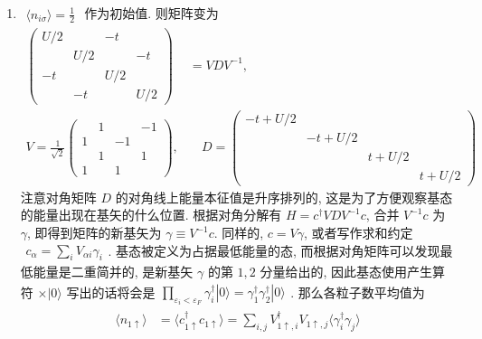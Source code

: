 \documentclass[../../main.tex]{subfiles}
\begin{document}
\begin{enumerate}
  \item $\begin{aligned}
    \langle n_{i\sigma}\rangle = \frac{1}{2}
  \end{aligned}$ 作为初始值. 则矩阵变为
  \begin{align*}
    \begin{pmatrix}
      U/2 &  & -t & \\
       & U/2 & & -t\\
      -t & & U/2 &  \\
       & -t &  & U/2
    \end{pmatrix} &= VDV^{-1},\\
    V = \frac{1}{\sqrt{2}}\begin{pmatrix}
        & 1 &    & -1\\
      1 &   & -1 &   \\
        & 1 &    &  1\\
      1 &   & 1  &
    \end{pmatrix},&\quad D = \begin{pmatrix}
      -t + U/2 &  &  & \\
       & -t + U/2 & & \\
       & & t + U/2 &  \\
       & & & t + U/2
    \end{pmatrix}
  \end{align*}
  注意对角矩阵 $D$ 的对角线上能量本征值是升序排列的, 这是为了方便观察基态的能量出现在基矢的什么位置. 根据对角分解有 $H = c^{\dagger}VDV^{-1}c$, 合并 $V^{-1}c$ 为 $\gamma$, 即得到矩阵的新基矢为 $\gamma\equiv V^{-1}c$. 同样的, $c = V\gamma$, 或者写作求和约定 $\begin{aligned}
    c_{\alpha} = \sum_{i}V_{\alpha i}\gamma_{i}
  \end{aligned}$. 基态被定义为占据最低能量的态, 而根据对角矩阵可以发现最低能量是二重简并的, 是新基矢 $\gamma$ 的第 $1,2$ 分量给出的, 因此基态使用产生算符 $\times|0\rangle$ 写出的话将会是$\begin{aligned}
    \prod_{\varepsilon_{i}<\varepsilon_{F}}\gamma_{i}^{\dagger}|0\rangle = \gamma_{1}^{\dagger}\gamma_{2}^{\dagger}|0\rangle
  \end{aligned}$. 那么各粒子数平均值为 
  \begin{align*}
    \langle n_{1\uparrow}\rangle 
    &= \langle c_{1\uparrow}^{\dagger}c_{1\uparrow}\rangle
     = \sum_{i,j}V_{1\uparrow,i}^{\dagger}V_{1\uparrow,j}\langle\gamma_{i}^{\dagger}\gamma_{j}\rangle\\

\end{align*}
\end{enumerate}
\end{document}
